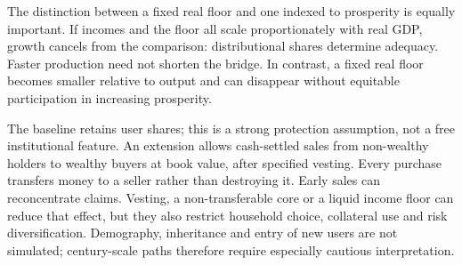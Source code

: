 The distinction between a fixed real floor and one indexed to prosperity is equally important. If incomes and the floor all scale proportionately with real GDP, growth cancels from the comparison: distributional shares determine adequacy. Faster production need not shorten the bridge. In contrast, a fixed real floor becomes smaller relative to output and can disappear without equitable participation in increasing prosperity.

The baseline retains user shares; this is a strong protection assumption, not a free institutional feature. An extension allows cash-settled sales from non-wealthy holders to wealthy buyers at book value, after specified vesting. Every purchase transfers money to a seller rather than destroying it. Early sales can reconcentrate claims. Vesting, a non-transferable core or a liquid income floor can reduce that effect, but they also restrict household choice, collateral use and risk diversification. Demography, inheritance and entry of new users are not simulated; century-scale paths therefore require especially cautious interpretation.

